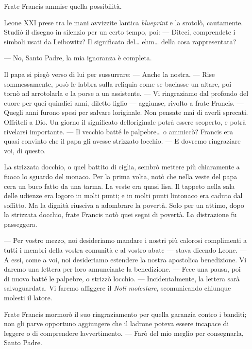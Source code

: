 Frate Francis ammise quella possibilità.

Leone XXI prese tra le mani avvizzite l\textquotesingle antica
\emph{blueprint} e la srotolò, cautamente. Studiò il disegno in silenzio
per un certo tempo, poi: --- Diteci, comprendete i simboli usati da
Leibowitz? Il significato del\ldots{} ehm\ldots{} della cosa
rappresentata?

--- No, Santo Padre, la mia ignoranza è completa.

Il papa si piegò verso di lui per sussurrare: --- Anche la nostra. ---
Rise sommessamente, posò le labbra sulla reliquia come se baciasse un
altare, poi tornò ad arrotolarla e la porse a un assistente. --- Vi
ringraziamo dal profondo del cuore per quei quindici anni, diletto
figlio --- aggiunse, rivolto a frate Francis. --- Quegli anni furono
spesi per salvare l\textquotesingle originale. Non pensate mai di averli
sprecati. Offriteli a Dio. Un giorno il significato
dell\textquotesingle originale potrà essere scoperto, e potrà rivelarsi
importante. --- Il vecchio batté le palpebre\ldots{} o ammiccò? Francis
era quasi convinto che il papa gli avesse strizzato
l\textquotesingle occhio. --- E dovremo ringraziare voi, di questo.

La strizzata d\textquotesingle occhio, o quel battito di ciglia, sembrò
mettere più chiaramente a fuoco lo sguardo del monaco. Per la prima
volta, notò che nella veste del papa c\textquotesingle era un buco fatto
da una tarma. La veste era quasi lisa. Il tappeto nella sala delle
udienze era logoro in molti punti; e in molti punti
l\textquotesingle intonaco era caduto dal soffitto. Ma la dignità
riusciva a adombrare la povertà. Solo per un attimo, dopo la strizzata
d\textquotesingle occhio, frate Francis notò quei segni di povertà. La
distrazione fu passeggera.

--- Per vostro mezzo, noi desideriamo mandare i nostri più calorosi
complimenti a tutti i membri della vostra comunità e al vostro abate ---
stava dicendo Leone. --- A essi, come a voi, noi desideriamo estendere
la nostra apostolica benedizione. Vi daremo una lettera per loro
annunciante la benedizione. --- Fece una pausa, poi di nuovo batté le
palpebre, o strizzò l\textquotesingle occhio. --- Incidentalmente, la
lettera sarà salvaguardata. Vi faremo affiggere il \emph{Noli
	molestare}, scomunicando chiunque molesti il latore.

Frate Francis mormorò il suo ringraziamento per quella garanzia contro i
banditi; non gli parve opportuno aggiungere che il ladrone poteva essere
incapace di leggere o di comprendere l\textquotesingle avvertimento. ---
Farò del mio meglio per consegnarla, Santo Padre.

